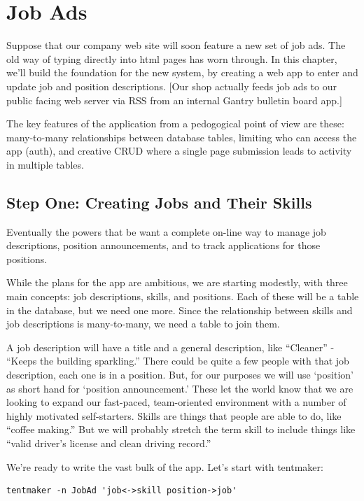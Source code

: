 \chapter{Job Ads}
\label{chap:jobads}

Suppose that our company web site will soon feature a new set of job ads.
The old way of typing directly into html pages has worn through.  In this
chapter, we'll build the foundation for the new system, by creating a web
app to enter and update job and position descriptions.  [Our shop actually
feeds job ads to our public facing web server via RSS from an internal
Gantry bulletin board app.]

The key features of the application from a pedogogical point of view are
these: many-to-many relationships between database tables, limiting who
can access the app (auth), and creative CRUD where a single page submission
leads to activity in multiple tables.

\section{Step One: Creating Jobs and Their Skills}

Eventually the powers that be want a complete on-line way to manage job
descriptions, position announcements, and to track applications for those
positions.

While the plans for the app are ambitious, we are starting modestly,
with three main concepts: job descriptions, skills, and positions.  Each
of these will be a table in the database, but we need one more.  Since
the relationship between skills and job descriptions is many-to-many, we
need a table to join them.

A job description will have a title and a general description, like
``Cleaner'' - ``Keeps the building sparkling.''  There could be quite
a few people with that job description, each one is in a position.
But, for our purposes we will use `position' as short hand for `position
announcement.'  These let the world know that we are looking to expand our
fast-paced, team-oriented environment with a number of highly motivated
self-starters.  Skills are things that people are able to do, like
``coffee making.''  But we will probably stretch the term skill to
include things like ``valid driver's license and clean driving record.''

We're ready to write the vast bulk of the app.  Let's start with
tentmaker:

\begin{verbatim}
tentmaker -n JobAd 'job<->skill position->job'
\end{verbatim}

